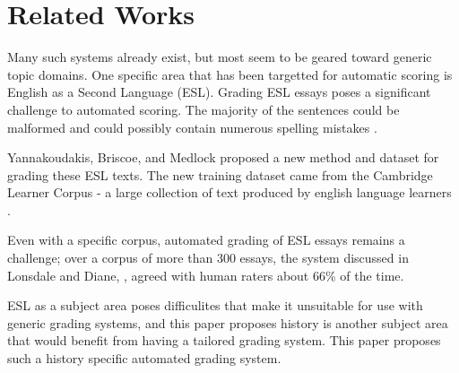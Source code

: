 \section{Related Works}
\label{section:motivation}
Many such systems already exist, but most seem to be geared toward generic topic domains. One specific area that has been targetted for automatic scoring is English as a Second Language (ESL). Grading ESL essays poses a significant challenge to automated scoring. The majority of the sentences could be malformed and could possibly contain numerous spelling mistakes \cite{ESOL2}.

Yannakoudakis, Briscoe, and Medlock proposed a new method and dataset for grading these ESL texts. The new training dataset came from the Cambridge Learner Corpus - a large collection of text produced by english language learners \cite{ESOL}. 

Even with a specific corpus, automated grading of ESL essays remains a challenge; over a corpus of more than 300 essays, the system discussed in Lonsdale and Diane, \cite{ESOL2}, agreed with human raters about 66\% of the time.\  

ESL as a subject area poses difficulites that make it unsuitable for use with generic grading systems, and this paper proposes history is another subject area that would benefit from having a tailored grading system. This paper proposes such a history specific automated grading system.
